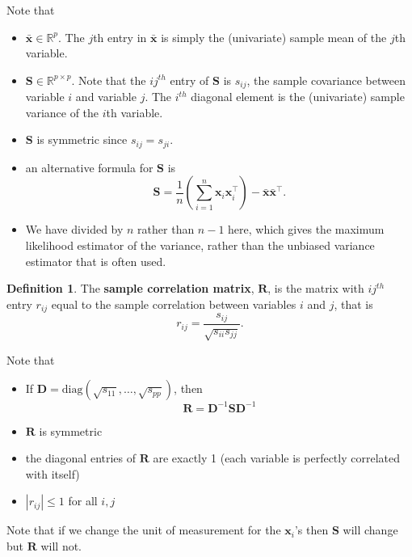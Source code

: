 \documentclass[
]{book}
\providecommand{\tightlist}{%
  \setlength{\itemsep}{0pt}\setlength{\parskip}{0pt}}
\theoremstyle{definition}
\newtheorem{definition}{Definition}[chapter]
\theoremstyle{definition}
\theoremstyle{definition}
\theoremstyle{definition}
\theoremstyle{remark}
\begin{document}
Note that

\begin{itemize}
\tightlist
\item
  \(\bar{\mathbf x} \in \mathbb{R}^p\). The \(j\)th entry in \(\bar{\mathbf x}\) is simply the (univariate) sample mean of the \(j\)th variable.
\item
  \(\mathbf S\in \mathbb{R}^{p\times p}\). Note that the \(ij^{th}\) entry of \(\mathbf S\) is \(s_{ij}\), the sample covariance between variable \(i\) and variable \(j\). The \(i^{th}\) diagonal element is the (univariate) sample variance of the \(i\)th variable.\\
\item
  \(\mathbf S\) is symmetric since \(s_{ij}=s_{ji}\).
\item
  an alternative formula for \(\mathbf S\) is
  \[\mathbf S= \frac{1}{n} \left(\sum_{i=1}^n \mathbf x_i \mathbf x_i^\top \right)- \bar{\mathbf x} \bar{\mathbf x}^\top.\]
\item
  We have divided by \(n\) rather than \(n-1\) here, which gives the maximum likelihood estimator of the variance, rather than the unbiased variance estimator that is often used.
\end{itemize}

\begin{definition}
\protect\hypertarget{def:samplecor}{}\label{def:samplecor}The \textbf{sample correlation matrix}, \(\mathbf R\), is the matrix with \(ij^{th}\) entry \(r_{ij}\) equal to the sample correlation between variables \(i\) and \(j\), that is
\[ r_{ij} = \frac{s_{ij}}{\sqrt{s_{ii}s_{jj}}}. \]
\end{definition}

Note that

\begin{itemize}
\tightlist
\item
  If \(\mathbf D= \text{diag}(\sqrt{s_{11}}, \dots, \sqrt{s_{pp}})\), then\\
  \[ \mathbf R= \mathbf D^{-1} \mathbf S\mathbf D^{-1} \]
\item
  \(\mathbf R\) is symmetric
\item
  the diagonal entries of \(\mathbf R\) are exactly 1 (each variable is perfectly correlated with itself)
\item
  \(|r_{ij}| \leq 1\) for all \(i, j\)
\end{itemize}

Note that if we change the unit of measurement for the \(\mathbf x_i\)'s then \(\mathbf S\) will change but \(\mathbf R\) will not.
\end{document}
